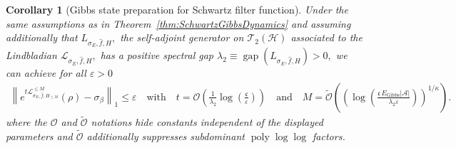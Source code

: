 \documentclass[11pt]{amsart}
\newcommand{\nn}{\nonumber}
\newcommand{\1}{\mathbbm{1}}
\newcommand{\cH}{\mathcal{H}}
\newcommand{\cL}{\mathcal{L}}
\newcommand{\eps}{\varepsilon}
\newcommand{\cA}{\mathcal{A}}
\theoremstyle{plain}
\newtheorem{corollary}[theorem]{Corollary}
\theoremstyle{definition}
\theoremstyle{remark}
\numberwithin{equation}{section}
\begin{document}
\begin{corollary}[Gibbs state preparation for Schwartz filter function]
\label{cor:SchwartzGibbs}
Under the same assumptions as in Theorem~\ref{thm:SchwartzGibbsDynamics} and assuming additionally that  $L_{\sigma_E,\widehat{f},H},$ the self-adjoint generator on $\mathscr{T}_2(\cH)$ associated to the Lindbladian $\cL_{\sigma_E,\widehat f,H},$ has a positive spectral gap 
$\lambda_2 \equiv \operatorname{gap}\left(L_{\sigma_E,\widehat f,H}\right) >0,$  
we can  achieve for all $\eps>0$
\begin{align}
\nn\left\|e^{t\cL^{\le M}_{\sigma_E,\widehat f,H_{\le M}}}(\rho) - \sigma_\beta\right\|_1 \le \eps\quad \text{with}\quad
t=\mathcal{O}\left(\frac{1}{\lambda_2}\log\left(\frac{\mathfrak{c}}{\eps}\right)\right) \quad\text{and}\quad M = \widetilde{\mathcal{O} }\left(\left(\log\left(\frac{\mathfrak{c}\,E_{\operatorname{Gibbs}}|\cA|}{\lambda_2 \eps}\right)\right)^{1/\kappa}\right).
\end{align}
where the $\mathcal{O}$ and $\widetilde{\mathcal{O}}$ notations hide constants independent of the displayed parameters and $\widetilde{\mathcal{O}}$ additionally suppresses subdominant $\operatorname{poly}\log\log$ factors.
\end{corollary}
\end{document}
